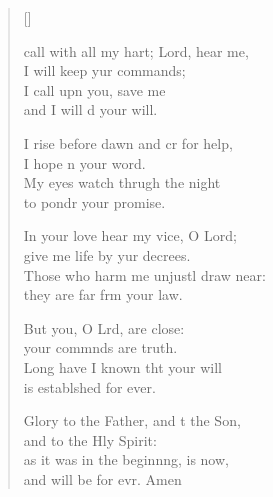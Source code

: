 \settowidth{\versewidth}{I call with all my heart; Lord, hear me, *}
\begin{verse}[\versewidth]
  \begin{patverse}
     call with all my hart; Lord, hear me,\Med\\
I will keep yur commands;\\
I call upn you, save me\Med\\
and I will d your will.

I rise before dawn and cr for help,\Med\\
I hope n your word.\\
My eyes watch thrugh the night\Med\\
to pondr your promise.

In your love hear my vice, O Lord;\Med\\
give me life by yur decrees.\\
Those who harm me unjustl draw near:\Med\\
they are far frm your law.

But you, O Lrd, are close:\Med\\
your commnds are truth.\\
Long have I known tht your will\Med\\
is establshed for ever.

Glory to the Father, and t the Son,\Med\\
and to the Hly Spirit:\\
as it was in the beginn\pointup{\i}ng, is now,\Med\\
and will be for evr. Amen
  \end{patverse}
\end{verse}
